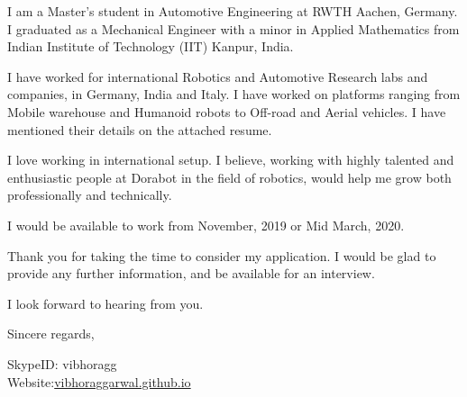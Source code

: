 \documentclass{letter} %
\begin{document}
\begin{letter}
I am a Master's student in Automotive Engineering at RWTH Aachen, Germany. I graduated as a Mechanical Engineer with a minor in Applied Mathematics from Indian Institute of Technology (IIT) Kanpur, India.

I have worked for international Robotics and Automotive Research labs and companies, in Germany, India and Italy. I have worked on platforms ranging from Mobile warehouse and Humanoid robots to Off-road and Aerial vehicles. I have mentioned their details on the attached resume. 

 I love working in international setup. I believe, working with highly talented and enthusiastic people at Dorabot in the field of robotics, would help me grow both professionally and technically. 
 
I would be available to work from November, 2019 or Mid March, 2020.

Thank you for taking the time to consider my application. I would be glad to provide any further information, and be available for an interview.

I look forward to hearing from you.

\closing{Sincere regards,} 
SkypeID: vibhoragg\\
Website:\href{https://vibhoraggarwal.github.io/}{vibhoraggarwal.github.io}

\end{letter}
 
\end{document}
